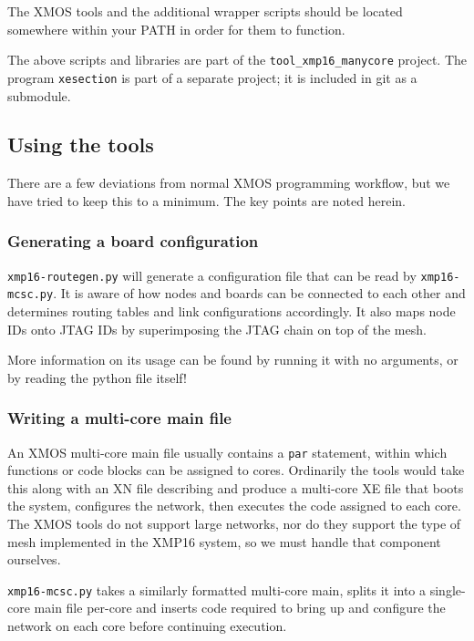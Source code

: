 \documentclass[12pt,a4paper,final,twoside]{article}
\begin{document}
The XMOS tools and the additional wrapper scripts should be located somewhere within your PATH in order for them to function.

The above scripts and libraries are part of the \texttt{tool\_xmp16\_manycore} project. The program \texttt{xesection} is part of a separate project; it is included in git as a submodule.

\subsection{Using the tools}

There are a few deviations from normal XMOS programming workflow, but we have tried to keep this to a minimum. The key points are noted herein.

\subsubsection{Generating a board configuration}

\texttt{xmp16-routegen.py} will generate a configuration file that can be read by \texttt{xmp16-mcsc.py}. It is aware of how nodes and boards can be connected to each other and determines routing tables and link configurations accordingly. It also maps node IDs onto JTAG IDs by superimposing the JTAG chain on top of the mesh.

More information on its usage can be found by running it with no arguments, or by reading the python file itself!

\subsubsection{Writing a multi-core main file}

An XMOS multi-core main file usually contains a \texttt{par} statement, within which functions or code blocks can be assigned to cores. Ordinarily the tools would take this along with an XN file describing and produce a multi-core XE file that boots the system, configures the network, then executes the code assigned to each core. The XMOS tools do not support large networks, nor do they support the type of mesh implemented in the XMP16 system, so we must handle that component ourselves.

\texttt{xmp16-mcsc.py} takes a similarly formatted multi-core main, splits it into a single-core main file per-core and inserts code required to bring up and configure the network on each core before continuing execution.
\end{document}
